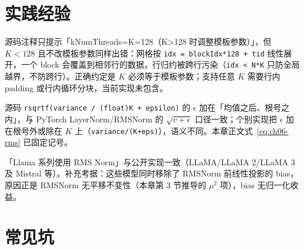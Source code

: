 \section{实践经验}

\begin{kaogu}
源码注释只提示「kNumThreads=K=128（K>128 时调整模板参数）」，但 $K < 128$ 且不改模板参数同样出错：网格按 \texttt{idx =\allowbreak{} block\allowbreak{}Idx*128 + tid} 线性展开，一个 block 会覆盖到相邻行的数据，行归约被跨行污染（\texttt{idx < N*K} 只防全局越界，不防跨行）。正确约定是 $K$ 必须等于模板参数；支持任意 $K$ 需要行内 padding 或行内循环分块，当前实现未包含。
\end{kaogu}

\begin{kaogu}
源码 \texttt{rsqrtf\allowbreak{}(variance /\allowbreak{} (float)K + epsilon)} 的 $\epsilon$ 加在「均值之后、根号之内」，与 PyTorch LayerNorm/RMSNorm 的 $\sqrt{v + \epsilon}$ 口径一致；个别实现把 $\epsilon$ 加在根号外或除在 $K$ 上（\texttt{variance/\allowbreak{}(K+eps)}），语义不同。本章正文式~\eqref{eq:ch06-rms} 已固定记号。
\end{kaogu}

\begin{kaogu}
「Llama 系列使用 RMS Norm」与公开实现一致（LLaMA/LLaMA 2/LLaMA 3 及 Mistral 等）。补充考据：这些模型同时移除了 RMSNorm 前线性投影的 bias，原因正是 RMSNorm 无平移不变性（本章第 3 节推导的 $\mu^2$ 项），bias 无归一化收益。
\end{kaogu}

\section{常见坑}

